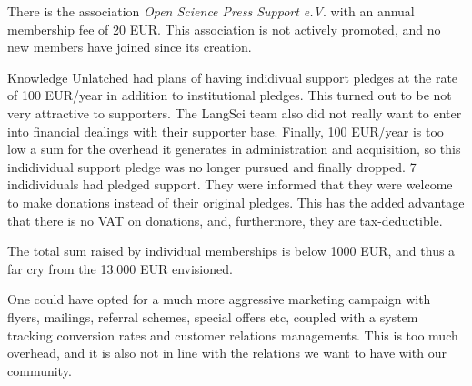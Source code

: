 \documentclass[nonflat,smallfont
]{langsci/langscibook}
\newcommand{\evaluation}[1]{
  \renewcommand{\tblslinecolour}{lsLightOrange}
  \tblssy{receipt}{Evaluation}{\vspace*{-5mm}#1}
}
\newcommand{\othersolutions}[1]{
  \renewcommand{\tblslinecolour}{lsDarkGreenOne}
  \tblssy{more}{Other solutions}{\vspace*{-5mm}#1}
}
\renewcommand{\tblssy}[4][black!12]{%
  \renewcommand{\langscisymbol}{#2}\renewcommand{\tblsboxcolor}{#1}
  \begin{mdframed}[style=yellowexercise,frametitle={#3}]
    #4
  \end{mdframed}
}
\begin{document}
\evaluation{
There is the association \textit{Open Science Press Support e.V}. with an annual membership fee of 20 EUR. This association is not actively promoted, and no new members have joined since its creation. 

Knowledge Unlatched had plans of having indidivual support pledges at the rate of 100 EUR/year in addition to institutional pledges. This turned out to be not very attractive to supporters. The LangSci team also did not really want to enter into financial dealings with their supporter base. Finally, 100 EUR/year is too low a sum for the overhead it generates in administration and acquisition, so this indidividual support pledge was no longer pursued and finally dropped. 7 indidividuals had pledged support. They were informed that they were welcome to make donations instead of their original pledges. This has the added advantage that there is no VAT on donations, and, furthermore, they are tax-deductible. 

The total sum raised by individual memberships is below 1000 EUR, and thus a far cry from the 13.000 EUR envisioned. 

}
\othersolutions{
One could have opted for a much more aggressive marketing campaign with flyers, mailings, referral schemes, special offers etc, coupled with a system tracking conversion rates and customer relations managements. This is too much overhead, and it is also not in line with the relations we want to have with our community. 
}

\newpage 
\end{document}
